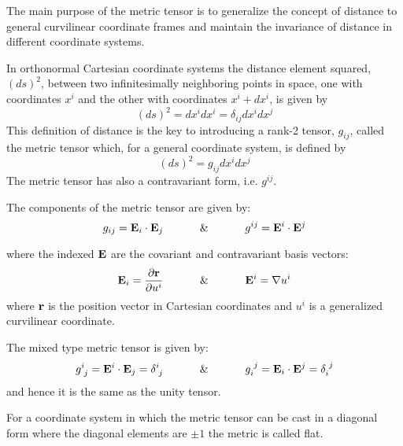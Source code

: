  The main purpose of the metric tensor is to generalize
the concept of distance to general curvilinear coordinate frames and
maintain the invariance of distance in different coordinate systems.

 In orthonormal Cartesian coordinate systems the distance
element squared, $\left(ds\right)^{2}$, between two infinitesimally
neighboring points in space, one with coordinates $x^{i}$ and the
other with coordinates $x^{i}+dx^{i}$, is given by
\begin{equation}
\left(ds\right)^{2}=dx^{i}dx^{i}=\delta_{ij}dx^{i}dx^{j}
\end{equation}
This definition of distance is the key to introducing a rank-2 tensor,
$g_{ij}$, called the metric tensor which, for a general coordinate
system, is defined by
\begin{equation}
\left(ds\right)^{2}=g_{ij}dx^{i}dx^{j}
\end{equation}
The metric tensor has also a contravariant form, i.e. $g^{ij}$.

 The components of the metric tensor are given by:
\begin{equation}
g_{ij}=\mathbf{ E}_{i}\cdot\mathbf{ E}_{j}\,\,\,\,\,\,\,\,\,\,\,\,\,\,\,\,\,\,\,\,
\&\,\,\,\,\,\,\,\,\,\,\,\,\,\,\,\,\,\,\,\,g^{ij}=\mathbf{ E}^{i}\cdot\mathbf{ E}^{
j}
\end{equation}


where the indexed $\mathbf{ E}$ are the covariant and contravariant
basis vectors:
\begin{equation}
\mathbf{ E}_{i}=\frac{\partial\mathbf{ r}}{\partial u^{i}}\,\,\,\,\,\,\,\,\,\,\,\,\,\,\,\,\,\,\,\,\&\,\,\,\,\,\,\,\,\,\,\,\,\,\,\,\,\,\,\,\,\mathbf{ E}^{i}=\nabla u^{i}
\end{equation}
where $\mathbf{ r}$ is the position vector in Cartesian coordinates
and $u^{i}$ is a generalized curvilinear coordinate. 


 The mixed type metric tensor is given by:
\begin{equation}
g_{\,\,j}^{i}=\mathbf{ E}^{i}\cdot\mathbf{ E}_{j}=\delta_{\,\,j}^{i}\,\,\,\,\,\,\,
\,\,\,\,\,\,\,\,\,\,\,\,\,\&\,\,\,\,\,\,\,\,\,\,\,\,\,\,\,\,\,\,\,\,g_{i}^{\,\,j
}=\mathbf{ E}_{i}\cdot\mathbf{ E}^{j}=\delta_{i}^{\,\,j}
\end{equation}
and hence it is the same as the unity tensor.

 For a coordinate system in which the metric tensor can
be cast in a diagonal form where the diagonal elements are $\pm1$
the metric is called flat.

